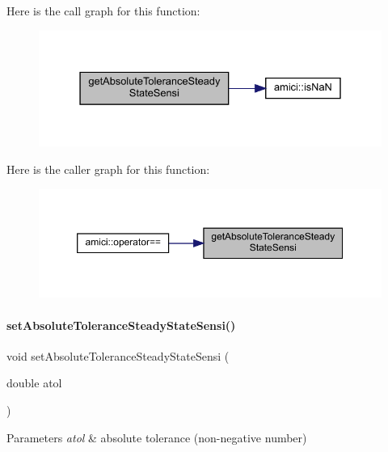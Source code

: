 Here is the call graph for this function\+:
\nopagebreak
\begin{figure}[H]
\begin{center}
\leavevmode
\includegraphics[width=331pt]{classamici_1_1_solver_ae1b148791e34ba2220eba9c75d21afb0_cgraph}
\end{center}
\end{figure}
Here is the caller graph for this function\+:
\nopagebreak
\begin{figure}[H]
\begin{center}
\leavevmode
\includegraphics[width=350pt]{classamici_1_1_solver_ae1b148791e34ba2220eba9c75d21afb0_icgraph}
\end{center}
\end{figure}
\mbox{\label{classamici_1_1_solver_a7907d753a8151ececcb4f60cb9721064}} 
\paragraph{\texorpdfstring{setAbsoluteToleranceSteadyStateSensi()}{setAbsoluteToleranceSteadyStateSensi()}}
{\footnotesize\ttfamily void set\+Absolute\+Tolerance\+Steady\+State\+Sensi (\begin{DoxyParamCaption}\item[{double}]{atol }\end{DoxyParamCaption})}


\begin{DoxyParams}{Parameters}
{\em atol} & absolute tolerance (non-\/negative number) \\
\hline
\end{DoxyParams}


